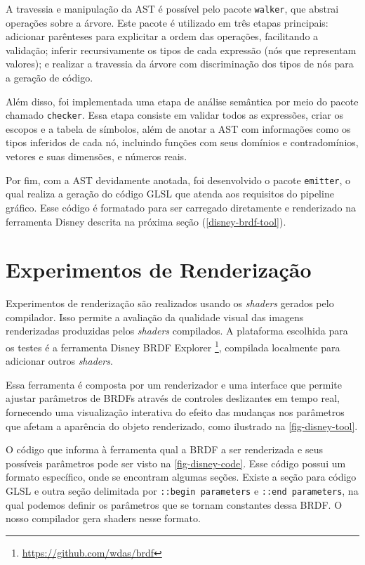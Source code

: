 A travessia e manipulação da AST é possível pelo pacote \texttt{walker}, que abstrai operações sobre a árvore. Este pacote é utilizado em três etapas principais: adicionar parênteses para explicitar a ordem das operações, facilitando a validação; inferir recursivamente os tipos de cada expressão (nós que representam valores); e realizar a travessia da árvore com discriminação dos tipos de nós para a geração de código.

Além disso, foi implementada uma etapa de análise semântica por meio do pacote chamado \texttt{checker}. Essa etapa consiste em validar todos as expressões, criar os escopos e a tabela de símbolos, além de anotar a AST com informações como os tipos inferidos de cada nó, incluindo funções com seus domínios e contradomínios, vetores e suas dimensões, e números reais.

Por fim, com a AST devidamente anotada, foi desenvolvido o pacote \texttt{emitter}, o qual realiza a geração do código GLSL que atenda aos requisitos do pipeline gráfico. Esse código é formatado para ser carregado diretamente e renderizado na ferramenta Disney descrita na próxima seção (\autoref{disney-brdf-tool}).

\section{Experimentos de Renderização} \label{experimentos-renderizacao}


Experimentos de renderização são realizados usando os \textit{shaders} gerados pelo compilador. Isso permite a avaliação da qualidade visual das imagens renderizadas produzidas pelos \textit{shaders} compilados. A plataforma escolhida para os testes é a ferramenta \label{disney-brdf-tool} Disney BRDF Explorer \footnote{\url{https://github.com/wdas/brdf}}, compilada localmente para adicionar outros \textit{shaders}.


Essa ferramenta é composta por um renderizador e uma interface que permite ajustar parâmetros de BRDFs através de controles deslizantes em tempo real, fornecendo uma visualização interativa do efeito das mudanças nos parâmetros que afetam a aparência do objeto renderizado, como ilustrado na \autoref{fig-disney-tool}. 

O código que informa à ferramenta qual a BRDF a ser renderizada e seus possíveis parâmetros pode ser visto na \autoref{fig-disney-code}. Esse código possui um formato específico, onde se encontram algumas seções. Existe a seção para código GLSL e outra seção delimitada por \texttt{::begin parameters} e \texttt{::end parameters}, na qual podemos definir os parâmetros que se tornam constantes dessa BRDF. O nosso compilador gera shaders nesse formato.



